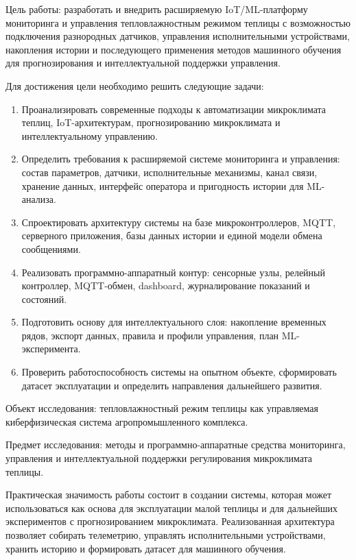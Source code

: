 \documentclass[a4paper,14pt]{extarticle}
\providecommand{\tightlist}{%
  \setlength{\itemsep}{0pt}\setlength{\parskip}{0pt}}
\begin{document}
Цель работы: разработать и внедрить расширяемую IoT/ML-платформу
мониторинга и управления тепловлажностным режимом теплицы с возможностью
подключения разнородных датчиков, управления исполнительными
устройствами, накопления истории и последующего применения методов
машинного обучения для прогнозирования и интеллектуальной поддержки
управления.

Для достижения цели необходимо решить следующие задачи:

\begin{enumerate}
\def\labelenumi{\arabic{enumi})}
\tightlist
\item
  Проанализировать современные подходы к автоматизации микроклимата
  теплиц, IoT-архитектурам, прогнозированию микроклимата и
  интеллектуальному управлению.
\item
  Определить требования к расширяемой системе мониторинга и управления:
  состав параметров, датчики, исполнительные механизмы, канал связи,
  хранение данных, интерфейс оператора и пригодность истории для
  ML-анализа.
\item
  Спроектировать архитектуру системы на базе микроконтроллеров, MQTT,
  серверного приложения, базы данных истории и единой модели обмена
  сообщениями.
\item
  Реализовать программно-аппаратный контур: сенсорные узлы, релейный
  контроллер, MQTT-обмен, dashboard, журналирование показаний и
  состояний.
\item
  Подготовить основу для интеллектуального слоя: накопление временных
  рядов, экспорт данных, правила и профили управления, план
  ML-эксперимента.
\item
  Проверить работоспособность системы на опытном объекте, сформировать
  датасет эксплуатации и определить направления дальнейшего развития.
\end{enumerate}

Объект исследования: тепловлажностный режим теплицы как управляемая
киберфизическая система агропромышленного комплекса.

Предмет исследования: методы и программно-аппаратные средства
мониторинга, управления и интеллектуальной поддержки регулирования
микроклимата теплицы.

Практическая значимость работы состоит в создании системы, которая может
использоваться как основа для эксплуатации малой теплицы и для
дальнейших экспериментов с прогнозированием микроклимата. Реализованная
архитектура позволяет собирать телеметрию, управлять исполнительными
устройствами, хранить историю и формировать датасет для машинного
обучения.
\end{document}
